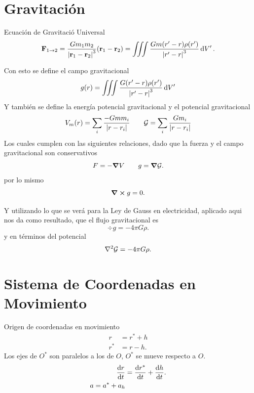 \chapter{Gravitación}
Ecuación de Gravitació Universal
\begin{equation}
	\vb{F} _{1\to 2} = \frac{Gm_1 m_2}{\abs{\vb{r}_1 - \vb{r}_2}^3} \qty(\vb{r}_1 - \vb{r}_2) = \iiint \frac{Gm (r' - r) \rho (r')}{\abs{r' - r}^3} \dd{V'} .
\end{equation}

Con esto se define el campo gravitacional
\begin{equation}
	g(r) = \iiint \frac{G (r' - r) \rho (r')}{\abs{r' - r}^3} \dd{V'}
\end{equation}
Y también se define la energía potencial gravitacional y el potencial gravitacional
\begin{equation}
	V_m (r) = \sum _i \frac{-Gmm_i}{\abs{r - r_i}} \qquad \mathcal{G} = \sum _i \frac{Gm_i}{\abs{r - r_i}}
\end{equation}
Los cuales cumplen con las siguientes relaciones, dado que la fuerza y el campo gravitacional son conservativos
\begin{equation}
	F = -\grad{V} \qquad g = \grad{\mathcal{G}}.
\end{equation}
por lo mismo
\begin{equation}
	\curl{g} = 0.
\end{equation}

Y utilizando lo que se verá para la Ley de Gauss en electricidad, aplicado aqui nos da como resultado, que el flujo gravitacional es
\begin{equation}
	\div{g} = -4\pi G\rho .
\end{equation}
y en términos del potencial
\begin{equation}
	\laplacian{\mathcal{G}} = -4\pi G\rho .
\end{equation}





\chapter{Sistema de Coordenadas en Movimiento}

Origen de coordenadas en movimiento
\begin{align*}
	r &= r^* + h \\
	r^* &= r - h .
\end{align*}
Los ejes de $O^*$ son paralelos a los de $O$, $O^*$ se mueve respecto a $O$.
\begin{align*}
	\dv{r}{t} &= \dv{r^*}{t} + \dv{h}{t}. \\
	a = a^* + a_h
\end{align*}

